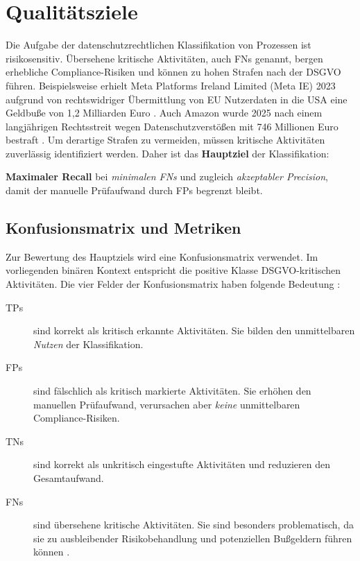 \section{Qualitätsziele}\label{sec:qualitatsziele}

Die Aufgabe der datenschutzrechtlichen Klassifikation von Prozessen ist risikosensitiv. Übersehene kritische Aktivitäten, auch \acp{FN} genannt, bergen erhebliche Compliance-Risiken und können zu hohen Strafen nach der \ac{DSGVO} führen. Beispielsweise erhielt Meta Platforms Ireland Limited (Meta IE) 2023 aufgrund von rechtswidriger Übermittlung von \ac{EU} Nutzerdaten in die USA eine Geldbuße von 1,2 Milliarden Euro \cite{edpb-meta-fine}. Auch Amazon wurde 2025 nach einem langjährigen Rechtsstreit wegen Datenschutzverstößen mit 746 Millionen Euro bestraft \cite{datenschutzticker-amazon-fine, reuters-amazon-fine}. Um derartige Strafen zu vermeiden, müssen kritische Aktivitäten zuverlässig identifiziert werden. Daher ist das \textbf{Hauptziel} der Klassifikation:

\begin{hauptzielbox}
    \textbf{Maximaler Recall} bei \emph{minimalen \acp{FN}} und zugleich \emph{akzeptabler Precision}, damit der manuelle Prüfaufwand durch \acp{FP} begrenzt bleibt.
\end{hauptzielbox}

\subsection*{Konfusionsmatrix und Metriken}

Zur Bewertung des Hauptziels wird eine Konfusionsmatrix verwendet. Im vorliegenden binären Kontext entspricht die positive Klasse \ac{DSGVO}-kritischen Aktivitäten. Die vier Felder der Konfusionsmatrix haben folgende Bedeutung \cite{sokolova2009measureclassification}:

\begin{description}
    \item [\acp{TP}] sind korrekt als kritisch erkannte Aktivitäten. Sie bilden den unmittelbaren \emph{Nutzen} der Klassifikation.
    \item [\acp{FP}] sind fälschlich als kritisch markierte Aktivitäten. Sie erhöhen den manuellen Prüfaufwand, verursachen aber \emph{keine} unmittelbaren Compliance-Risiken.
    \item[\acp{TN}] sind korrekt als unkritisch eingestufte Aktivitäten und reduzieren den Gesamtaufwand.
    \item[\acp{FN}] sind übersehene kritische Aktivitäten. Sie sind besonders problematisch, da sie zu ausbleibender Risikobehandlung und potenziellen Bußgeldern führen können \cite{nake2023towards}.
\end{description}

